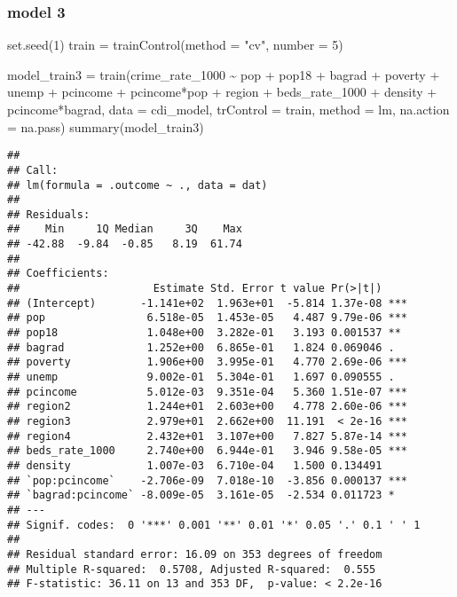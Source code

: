 \documentclass[
  11pt,
]{article}
\newenvironment{Shaded}{\begin{snugshade}}{\end{snugshade}}
\newcommand{\AttributeTok}[1]{\textcolor[rgb]{0.77,0.63,0.00}{#1}}
\newcommand{\DecValTok}[1]{\textcolor[rgb]{0.00,0.00,0.81}{#1}}
\newcommand{\FunctionTok}[1]{\textcolor[rgb]{0.00,0.00,0.00}{#1}}
\newcommand{\NormalTok}[1]{#1}
\newcommand{\OtherTok}[1]{\textcolor[rgb]{0.56,0.35,0.01}{#1}}
\newcommand{\SpecialCharTok}[1]{\textcolor[rgb]{0.00,0.00,0.00}{#1}}
\newcommand{\StringTok}[1]{\textcolor[rgb]{0.31,0.60,0.02}{#1}}
\begin{document}
\hypertarget{model-3}{%
\subsubsection{model 3}\label{model-3}}

\begin{Shaded}
\begin{Highlighting}[]
\FunctionTok{set.seed}\NormalTok{(}\DecValTok{1}\NormalTok{)}
\NormalTok{train }\OtherTok{=} \FunctionTok{trainControl}\NormalTok{(}\AttributeTok{method =} \StringTok{"cv"}\NormalTok{, }\AttributeTok{number =} \DecValTok{5}\NormalTok{)}

\NormalTok{model\_train3 }\OtherTok{=} \FunctionTok{train}\NormalTok{(crime\_rate\_1000 }\SpecialCharTok{\textasciitilde{}}  
\NormalTok{                  pop }\SpecialCharTok{+}\NormalTok{ pop18 }\SpecialCharTok{+}\NormalTok{ bagrad }\SpecialCharTok{+}
\NormalTok{                  poverty }\SpecialCharTok{+}\NormalTok{ unemp }\SpecialCharTok{+}\NormalTok{ pcincome }\SpecialCharTok{+}\NormalTok{ pcincome}\SpecialCharTok{*}\NormalTok{pop }\SpecialCharTok{+}\NormalTok{ region }\SpecialCharTok{+}
\NormalTok{                  beds\_rate\_1000 }\SpecialCharTok{+}\NormalTok{ density }\SpecialCharTok{+}
\NormalTok{                  pcincome}\SpecialCharTok{*}\NormalTok{bagrad,  }\AttributeTok{data =}\NormalTok{ cdi\_model,}
                   \AttributeTok{trControl =}\NormalTok{ train,}
                   \AttributeTok{method =} \StringTok{\textquotesingle{}lm\textquotesingle{}}\NormalTok{,}
                   \AttributeTok{na.action =}\NormalTok{ na.pass)}
\FunctionTok{summary}\NormalTok{(model\_train3)}
\end{Highlighting}
\end{Shaded}

\begin{verbatim}
## 
## Call:
## lm(formula = .outcome ~ ., data = dat)
## 
## Residuals:
##    Min     1Q Median     3Q    Max 
## -42.88  -9.84  -0.85   8.19  61.74 
## 
## Coefficients:
##                     Estimate Std. Error t value Pr(>|t|)    
## (Intercept)       -1.141e+02  1.963e+01  -5.814 1.37e-08 ***
## pop                6.518e-05  1.453e-05   4.487 9.79e-06 ***
## pop18              1.048e+00  3.282e-01   3.193 0.001537 ** 
## bagrad             1.252e+00  6.865e-01   1.824 0.069046 .  
## poverty            1.906e+00  3.995e-01   4.770 2.69e-06 ***
## unemp              9.002e-01  5.304e-01   1.697 0.090555 .  
## pcincome           5.012e-03  9.351e-04   5.360 1.51e-07 ***
## region2            1.244e+01  2.603e+00   4.778 2.60e-06 ***
## region3            2.979e+01  2.662e+00  11.191  < 2e-16 ***
## region4            2.432e+01  3.107e+00   7.827 5.87e-14 ***
## beds_rate_1000     2.740e+00  6.944e-01   3.946 9.58e-05 ***
## density            1.007e-03  6.710e-04   1.500 0.134491    
## `pop:pcincome`    -2.706e-09  7.018e-10  -3.856 0.000137 ***
## `bagrad:pcincome` -8.009e-05  3.161e-05  -2.534 0.011723 *  
## ---
## Signif. codes:  0 '***' 0.001 '**' 0.01 '*' 0.05 '.' 0.1 ' ' 1
## 
## Residual standard error: 16.09 on 353 degrees of freedom
## Multiple R-squared:  0.5708, Adjusted R-squared:  0.555 
## F-statistic: 36.11 on 13 and 353 DF,  p-value: < 2.2e-16
\end{verbatim}
\end{document}
